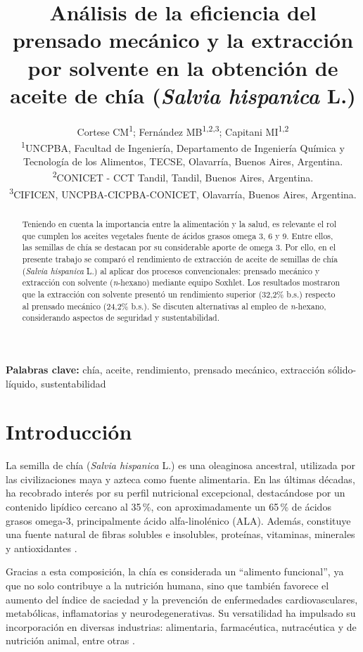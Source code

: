 \documentclass[12pt,a4paper]{article}
\title{Análisis de la eficiencia del prensado mecánico y la extracción por solvente en la obtención de aceite de chía (\textit{Salvia hispanica} L.)}
\author{%
\parbox{\textwidth}{\centering
Cortese CM\textsuperscript{1}\orcidlink{0009-0002-2184-7991};\;
Fernández MB\textsuperscript{1,2,3}\orcidlink{0000-0001-6910-5474};\;
Capitani MI\textsuperscript{1,2}\orcidlink{0000-0001-5663-4537} \\[1em]
{\small
\textsuperscript{1}UNCPBA, Facultad de Ingeniería, Departamento de Ingeniería Química y Tecnología de los Alimentos, TECSE, Olavarría, Buenos Aires, Argentina. \\
\textsuperscript{2}CONICET - CCT Tandil, Tandil, Buenos Aires, Argentina. \\
\textsuperscript{3}CIFICEN, UNCPBA-CICPBA-CONICET, Olavarría, Buenos Aires, Argentina.
}
}
}
\date{}
\begin{document}
\maketitle

\renewcommand{\abstractname}{Resumen}
\begin{abstract}

Teniendo en cuenta la importancia entre la alimentación y la salud, es relevante el rol que cumplen los aceites vegetales fuente de ácidos grasos omega 3, 6 y 9. Entre ellos, las semillas de chía se destacan por su considerable aporte de omega 3. Por ello, en el presente trabajo se comparó el rendimiento de extracción de aceite de semillas de chía (\textit{Salvia hispanica} L.) al aplicar  dos procesos convencionales: prensado mecánico y extracción con solvente (\textit{n}-hexano) mediante equipo Soxhlet. Los resultados mostraron que la extracción con solvente presentó un rendimiento superior (32,2\% b.s.) respecto al prensado mecánico (24,2\% b.s.). Se discuten alternativas al empleo de \textit{n}-hexano, considerando aspectos de seguridad y sustentabilidad.
\end{abstract}

\vspace{0.5em}
\noindent\textbf{Palabras clave:} chía, aceite, rendimiento, prensado mecánico, extracción sólido-líquido, sustentabilidad
\vspace{1em}

\section{Introducción}

La semilla de chía (\textit{Salvia hispanica} L.) es una oleaginosa ancestral, utilizada por las civilizaciones maya y azteca como fuente alimentaria. En las últimas décadas, ha recobrado interés por su perfil nutricional excepcional, destacándose por un contenido lipídico cercano al 35\,\%, con aproximadamente un 65\,\% de ácidos grasos omega-3, principalmente ácido alfa-linolénico (ALA). Además, constituye una fuente natural de fibras solubles e insolubles, proteínas, vitaminas, minerales y antioxidantes \citep{ixtaina2011characterization}.

Gracias a esta composición, la chía es considerada un “alimento funcional”, ya que no solo contribuye a la nutrición humana, sino que también favorece el aumento del índice de saciedad y la prevención de enfermedades cardiovasculares, metabólicas, inflamatorias y neurodegenerativas. Su versatilidad ha impulsado su incorporación en diversas industrias: alimentaria, farmacéutica, nutracéutica y de nutrición animal, entre otras \citep{munoz2013chia}.
\end{document}
